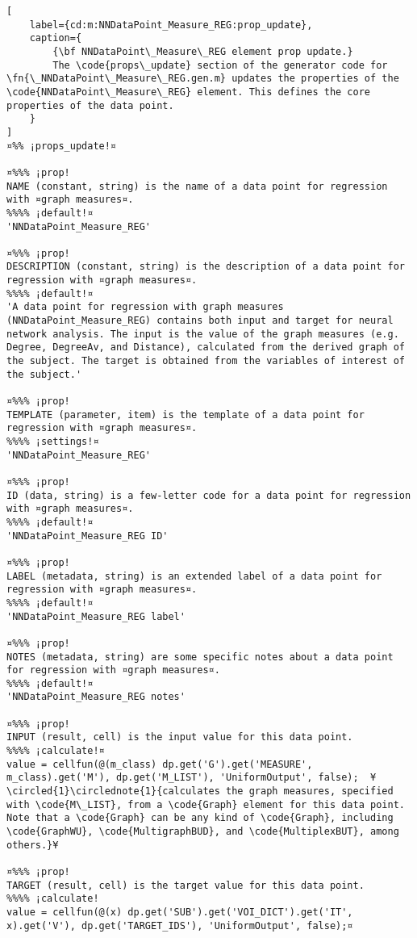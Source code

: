 \documentclass{tufte-handout}
\begin{document}
\begin{lstlisting}[
	label={cd:m:NNDataPoint_Measure_REG:prop_update},
	caption={
		{\bf NNDataPoint\_Measure\_REG element prop update.}
		The \code{props\_update} section of the generator code for \fn{\_NNDataPoint\_Measure\_REG.gen.m} updates the properties of the \code{NNDataPoint\_Measure\_REG} element. This defines the core properties of the data point.
	}
]
¤%% ¡props_update!¤

¤%%% ¡prop!
NAME (constant, string) is the name of a data point for regression with ¤graph measures¤.
%%%% ¡default!¤
'NNDataPoint_Measure_REG'

¤%%% ¡prop!
DESCRIPTION (constant, string) is the description of a data point for regression with ¤graph measures¤.
%%%% ¡default!¤
'A data point for regression with graph measures (NNDataPoint_Measure_REG) contains both input and target for neural network analysis. The input is the value of the graph measures (e.g. Degree, DegreeAv, and Distance), calculated from the derived graph of the subject. The target is obtained from the variables of interest of the subject.'

¤%%% ¡prop!
TEMPLATE (parameter, item) is the template of a data point for regression with ¤graph measures¤.
%%%% ¡settings!¤
'NNDataPoint_Measure_REG'

¤%%% ¡prop!
ID (data, string) is a few-letter code for a data point for regression with ¤graph measures¤.
%%%% ¡default!¤
'NNDataPoint_Measure_REG ID'

¤%%% ¡prop!
LABEL (metadata, string) is an extended label of a data point for regression with ¤graph measures¤.
%%%% ¡default!¤
'NNDataPoint_Measure_REG label'

¤%%% ¡prop!
NOTES (metadata, string) are some specific notes about a data point for regression with ¤graph measures¤.
%%%% ¡default!¤
'NNDataPoint_Measure_REG notes'

¤%%% ¡prop!
INPUT (result, cell) is the input value for this data point.
%%%% ¡calculate!¤ 
value = cellfun(@(m_class) dp.get('G').get('MEASURE', m_class).get('M'), dp.get('M_LIST'), 'UniformOutput', false);  ¥\circled{1}\circlednote{1}{calculates the graph measures, specified with \code{M\_LIST}, from a \code{Graph} element for this data point. Note that a \code{Graph} can be any kind of \code{Graph}, including \code{GraphWU}, \code{MultigraphBUD}, and \code{MultiplexBUT}, among others.}¥
    
¤%%% ¡prop!
TARGET (result, cell) is the target value for this data point.
%%%% ¡calculate!
value = cellfun(@(x) dp.get('SUB').get('VOI_DICT').get('IT', x).get('V'), dp.get('TARGET_IDS'), 'UniformOutput', false);¤

\end{lstlisting}
\end{document}

